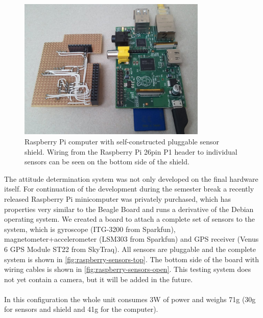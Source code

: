 \begin{figure}
\centering
\includegraphics[width=0.8\textwidth]{figures/raspberry-sensors-open.jpg}
\caption[Raspberry Pi computer with self-constructed pluggable sensor shield]{Raspberry Pi computer with self-constructed pluggable sensor shield.
Wiring from the Raspberry Pi 26pin P1 header to individual sensors can be seen on the bottom side of the shield.}
\label{fig:raspberry-sensors-open}
\end{figure}

The attitude determination system was not only developed on the final hardware itself.
For continuation of the development during the semester break a recently released Raspberry Pi minicomputer was privately purchased, which has properties very similar to the Beagle Board and runs a derivative of the Debian operating system. We created a board to attach a complete set of sensors to the system, which is gyroscope (ITG-3200 from Sparkfun), magnetometer+accelerometer (LSM303 from Sparkfun) and GPS receiver (Venus 6 GPS Module
ST22 from SkyTraq). All sensors are pluggable and the complete system is shown in \autoref{fig:raspberry-sensors-top}. The bottom side of the board with wiring cables is shown in \autoref{fig:raspberry-sensors-open}.
This testing system does not yet contain a camera, but it will be added in the future.
\\
\\
In this configuration the whole unit consumes 3W of power and weighs 71g (30g for sensors and shield and 41g for the computer).



